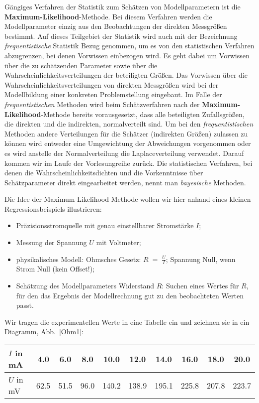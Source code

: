 Gängiges Verfahren der Statistik zum Schätzen von Modellparametern ist die \textbf{Maximum-Likelihood}-Methode.
Bei diesem Verfahren werden die Modellparameter einzig aus den Beobachtungen der direkten Messgrößen
bestimmt. Auf dieses Teilgebiet der Statistik wird auch mit der Bezeichnung \textsl{frequentistische}
Statistik Bezug genommen, um es von den statistischen Verfahren abzugrenzen, bei denen Vorwissen einbezogen wird. Es geht
dabei um Vorwissen über die zu schätzenden Parameter sowie über die Wahrscheinlichkeitsverteilungen der beteiligten Größen.
Das Vorwissen über die Wahrscheinlichkeitsverteilungen von direkten Messgrößen wird bei der Modellbildung einer konkreten Problemstellung
eingebaut. Im Falle der \textsl{frequentistischen} Methoden wird beim Schätzverfahren nach der \textbf{Maximum-Likelihood}-Methode
bereits vorausgesetzt, dass alle beteiligten Zufallsgrößen, die direkten und die indirekten, normalverteilt sind.
Um bei den \textsl{frequentistischen} Methoden andere Verteilungen für die Schätzer (indirekten Größen) zulassen
zu können wird entweder eine Umgewichtung der Abweichungen vorgenommen oder es wird anstelle der Normalverteilung die
Laplaceverteilung verwendet. Darauf kommen wir im Laufe der Vorlesungreihe zurück. Die statistischen Verfahren, bei denen
die Wahrscheinlichkeitsdichten und die Vorkenntnisse über Schätzparameter direkt eingearbeitet werden, nennt man
\textsl{bayesische} Methoden.

Die Idee der Maximum-Likelihood-Methode wollen wir hier anhand eines kleinen
Regressionsbeispiels illustrieren:
\begin{itemize}
\item Präzisionsstromquelle mit genau einstellbarer Stromstärke $I$;
\item Messung der Spannung $U$ mit Voltmeter;
\item physikalisches Modell: Ohmsches Gesetz: $R \; = \; \frac{U}{I}$; Spannung Null, wenn Strom Null (kein Offset!);
\item Schätzung des Modellparameters Widerstand $R$: Suchen eines Wertes für $R$, für den das
Ergebnis der Modellrechnung \glqq gut zu den beobachteten Werten passt\grqq.
\end{itemize}
Wir tragen die experimentellen Werte
in eine Tabelle ein und zeichnen sie in ein Diagramm, Abb.~\ref{Ohm1}:

\begin{center}
\begin{tabular}{l||c|c|c|c|c|c|c|c|c}
\hline\hline
 $I$ in mA & 4.0 &     6.0 &     8.0 &    10.0 &    12.0 &    14.0 &    16.0 &    18.0 &    20.0 \\
\hline
 $U$ in mV & 62.5 &    51.5 &    96.0 &   140.2 &   138.9 &   195.1 &   225.8 &   207.8 &   223.7 \\
\hline\hline
\end{tabular}
\end{center}

